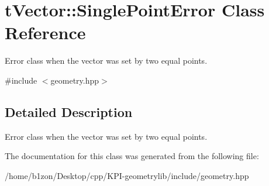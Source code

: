 \hypertarget{classtVector_1_1SinglePointError}{}\section{t\+Vector\+:\+:Single\+Point\+Error Class Reference}
\label{classtVector_1_1SinglePointError}


Error class when the vector was set by two equal points.  




{\ttfamily \#include $<$geometry.\+hpp$>$}



\subsection{Detailed Description}
Error class when the vector was set by two equal points. 

The documentation for this class was generated from the following file\+:\begin{DoxyCompactItemize}
\item 
/home/b1zon/\+Desktop/cpp/\+K\+P\+I-\/geometrylib/include/geometry.\+hpp\end{DoxyCompactItemize}
